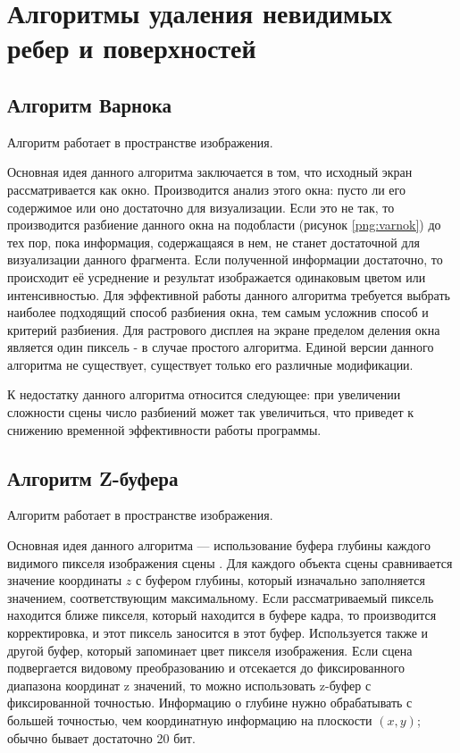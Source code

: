 \section{Алгоритмы удаления невидимых ребер и поверхностей}
\subsection{Алгоритм Варнока}
Алгоритм работает в пространстве изображения.

Основная идея данного алгоритма заключается в том, что исходный экран рассматривается как окно. Производится анализ этого окна: пусто ли его содержимое или оно достаточно для визуализации. Если это не так, то производится разбиение данного окна на подобласти (рисунок \ref{png:varnok}) до тех пор, пока информация, содержащаяся в нем, не станет достаточной для визуализации данного фрагмента. Если полученной информации достаточно, то происходит её усреднение и результат изображается одинаковым цветом или интенсивностью. Для эффективной работы данного алгоритма требуется выбрать наиболее подходящий способ разбиения окна, тем самым усложнив способ и критерий разбиения. Для растрового дисплея на экране пределом деления окна является один пиксель - в случае простого алгоритма. Единой версии данного алгоритма не существует, существует только его различные модификации.

\begin{figure}[H]
\end{figure}

К недостатку данного алгоритма относится следующее: при увеличении сложности сцены число разбиений может так увеличиться, что приведет к снижению временной эффективности работы программы.

\subsection{Алгоритм Z-буфера}
Алгоритм работает в пространстве изображения.

Основная идея данного алгоритма — использование буфера глубины каждого видимого пикселя изображения сцены \cite{zbuffer}. Для каждого объекта сцены сравнивается значение координаты $z$ с буфером глубины, который изначально заполняется значением, соответствующим максимальному. Если рассматриваемый пиксель находится ближе пикселя, который находится в буфере кадра, то производится корректировка, и этот пиксель заносится в этот буфер. Используется также и другой буфер, который запоминает цвет пикселя изображения. Если сцена подвергается видовому преобразованию и отсекается до фиксированного диапазона координат z значений, то можно использовать z-буфер с фиксированной точностью. Информацию о глубине нужно обрабатывать с большей точностью, чем координатную информацию на плоскости $(x, y)$; обычно бывает достаточно 20 бит.

